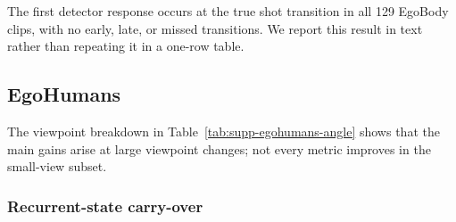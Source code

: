 \begin{table}[t]
  \centering
  \caption{EgoBody results by viewpoint change. W/WA are in mm and camera
  error is in m.}
  \label{tab:supp-egobody-angle}
  \supptablesize
  
\end{table}

The first detector response occurs at the true shot transition in all 129
EgoBody clips, with no early, late, or missed transitions. We report this
result in text rather than repeating it in a one-row table.

\FloatBarrier
\subsection{EgoHumans}
\label{app:egohumans-details}

The viewpoint breakdown in Table~\ref{tab:supp-egohumans-angle} shows that the
main gains arise at large viewpoint changes; not every metric improves in the
small-view subset.

\begin{table}[t]
  \centering
  \caption{EgoHumans results by viewpoint change. W/WA are in mm.}
  \label{tab:supp-egohumans-angle}
  \supptablesize
  
\end{table}

\begin{table}[t]
  \centering
  \caption{Paired Human3R--Shot3R analysis on 90 EgoHumans clips from 27
  captures. Intervals resample captures and then clips within each capture.}
  \label{tab:egohumans-paired}
  \supptablesize
  
\end{table}

\subsubsection{Recurrent-state carry-over}
\label{app:egohumans-state-isolation}

